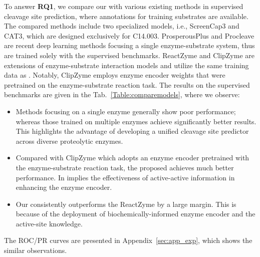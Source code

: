 To answer \textbf{RQ1}, we compare our {\method} with various existing methods in supervised cleavage site prediction, where annotations for training substrates are available. The compared methods include two specialized models, i.e., ScreenCap3 and CAT3, which are designed exclusively for C14.003. ProsperousPlus and Procleave are recent deep learning methods focusing a single enzyme-substrate system, thus are trained solely with the supervised benchmarks.  ReactZyme and ClipZyme are extensions of enzyme-substrate interaction models and utilize the same training data as {\method}. Notably, ClipZyme employs enzyme encoder weights that were pretrained on the enzyme-substrate reaction task. The results on the supervised benchmarks are given in the Tab.~\ref{Table:comparemodels}, where we observe:
\begin{itemize} [leftmargin=*]
    \item Methods focusing on a single enzyme generally show poor performance; whereas those trained on multiple enzymes achieve significantly better results. This highlights the advantage of developing a unified cleavage site predictor across diverse proteolytic enzymes.
    \item Compared with ClipZyme which adopts an enzyme encoder pretrained with the enzyme-substrate reaction task, the proposed {\method} achieves much better  performance. In implies the effectiveness of active-active information in enhancing the enzyme encoder.
    \item Our {\method} consistently outperforms the ReactZyme by a large margin. This is because of the deployment of biochemically-informed enzyme encoder and the active-site knowledge.
\end{itemize}
The ROC/PR curves are presented in Appendix~\ref{sec:app_exp}, which shows the similar observations.















